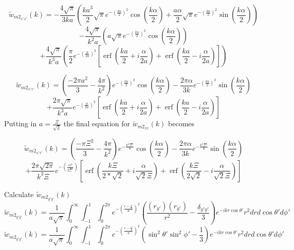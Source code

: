 \documentclass[double,12pt]{beavtex}
\begin{document}
\begin{displaymath}{\widetilde{w}_{{m2}_{x'x'}}(k)=-\frac{4\sqrt{\pi}}{3ka}\left(\frac{ka^3}{2}\sqrt{\pi}e^{-\left(\frac{ka}{2}\right)^2}\cos(\frac{k\alpha}{2})+\frac{a\alpha}{2}\sqrt{\pi}e^{-\left(\frac{ka}{2}\right)^2}\sin(\frac{k\alpha}{2})\right)}\end{displaymath} 
\begin{displaymath}{-\frac{4\sqrt{\pi}}{k^2a}\left(a\sqrt{\pi}e^{-\left(\frac{ka}{2}\right)^2}\cos(\frac{k\alpha}{2})\right)}\end{displaymath} 
\begin{equation}{+\frac{4\sqrt{\pi}}{k^3a}\left(\frac{\pi}{2}e^{-\left(\frac{\alpha}{2a}\right)^2}\left[\operatorname{erf}\left(\frac{ka}{2}+i\frac{\alpha}{2a}\right)+\operatorname{erf}\left(\frac{ka}{2}-i\frac{\alpha}{2a}\right)\right]\right)}\end{equation} 

\begin{displaymath}{\widetilde{w}_{{m2}_{x'x'}}(k)=\left(\frac{-2\pi{a}^2}{3}-\frac{4\pi}{k^2}\right)e^{-\left(\frac{ka}{2}\right)^2}\cos(\frac{k\alpha}{2})-\frac{2\pi\alpha}{3k}e^{-\left(\frac{ka}{2}\right)^2}\sin(\frac{k\alpha}{2})}\end{displaymath} 
\begin{equation}{+\frac{2\pi\sqrt{\pi}}{k^3a}e^{-\left(\frac{\alpha}{2a}\right)^2}\left[\operatorname{erf}\left(\frac{ka}{2}+i\frac{\alpha}{2a}\right)+\operatorname{erf}\left(\frac{ka}{2}-i\frac{\alpha}{2a}\right)\right]}\end{equation} 
Putting in $a=\frac{\Xi}{\sqrt{2}}$ the final equation for 
$\widetilde{w}_{{m2}_{xx}}(k)$ becomes

\begin{displaymath}{\widetilde{w}_{{m2}_{x'x'}}(k)=\left(\frac{-\pi{\Xi}^2}{3}-\frac{4\pi}{k^2}\right)e^{-\frac{k^2\Xi^2}{8}}\cos(\frac{k\alpha}{2})-\frac{2\pi\alpha}{3k}e^{-\frac{k^2\Xi^2}{8}}\sin(\frac{k\alpha}{2})}\end{displaymath} 
\begin{equation}{+\frac{2\pi\sqrt{2\pi}}{k^3\Xi}e^{-\left(\frac{\alpha^2}{2\Xi^2}\right)}\left[\operatorname{erf}\left(\frac{k\Xi}{2*\sqrt{2}}+i\frac{\alpha}{\sqrt{2}\Xi}\right)+\operatorname{erf}\left(\frac{k\Xi}{2\sqrt{2}}-i\frac{\alpha}{\sqrt{2}\Xi}\right)\right]}\end{equation} 


Calculate $\widetilde{w}_{{m2}_{y'y'}}(k)$ 
\begin{equation}{\widetilde{w}_{{m2}_{y'y'}}(k)=\frac{1}{a\sqrt{\pi}}\int_{0}^{\infty}\int_{-1}^{1}\int_{0}^{2\pi}e^{-\left(\frac{r-\frac{\alpha}{2}}{a}\right)^2}\left(\frac{(r_{y'})(r_{y'})}{r^2}-\frac{\delta_{y'y'}}{3}\right)e^{-ikr\cos\theta'}r^2d{r}d{\cos\theta'}d{\phi'}}\end{equation}
\begin{equation}{\widetilde{w}_{{m2}_{y'y'}}(k)=\frac{1}{a\sqrt{\pi}}\int_{0}^{\infty}\int_{-1}^{1}\int_{0}^{2\pi}e^{-\left(\frac{r-\frac{\alpha}{2}}{a}\right)^2}\left(\sin^2\theta'\sin^2\phi'-\frac{1}{3}\right)e^{-ikr\cos\theta'}r^2d{r}d{\cos\theta'}d{\phi'}}\end{equation}
\end{document}
